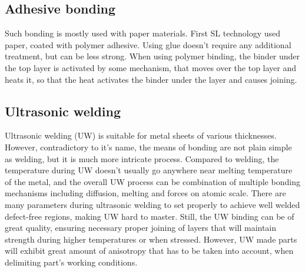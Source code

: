 \documentclass[a4paper, twoside, 11pt]{report}
\begin{document}
\subsection{Adhesive bonding}
Such bonding is mostly used with paper materials. First SL technology used paper, coated with polymer adhesive. Using glue doesn't require any additional treatment, but can be less strong. When using polymer binding, the binder under the top layer is activated by some mechanism, that moves over the top layer and heats it, so that the heat  activates the binder under the layer and causes joining.

\subsection{Ultrasonic welding}
Ultrasonic welding (UW) is suitable for metal sheets of various thicknesses. However, contradictory to it's name, the means of bonding are not plain simple as welding, but it is much more intricate process. Compared to welding, the temperature during UW doesn't usually go anywhere near melting temperature of the metal, and the overall UW process can be combination of multiple bonding mechanisms including diffusion, melting and forces on atomic scale. There are many parameters during ultrasonic welding to set properly to achieve well welded defect-free regions, making UW hard to master. Still, the UW binding can be of great quality, ensuring necessary proper joining of layers that will maintain strength during higher temperatures or when stressed. However, UW made parts will exhibit great amount of anisotropy that has to be taken into account, when delimiting part's working conditions.
\end{document}
